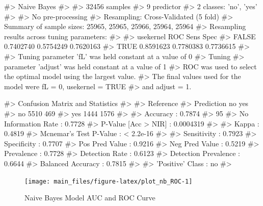 \begin{Schunk}
\begin{Soutput}
#> Naive Bayes 
#> 
#> 32456 samples
#>     9 predictor
#>     2 classes: 'no', 'yes' 
#> 
#> No pre-processing
#> Resampling: Cross-Validated (5 fold) 
#> Summary of sample sizes: 25965, 25965, 25966, 25964, 25964 
#> Resampling results across tuning parameters:
#> 
#>   usekernel  ROC        Sens       Spec     
#>   FALSE      0.7402740  0.5754249  0.7620163
#>    TRUE      0.8591623  0.7780383  0.7736615
#> 
#> Tuning parameter 'fL' was held constant at a value of 0
#> Tuning
#>  parameter 'adjust' was held constant at a value of 1
#> ROC was used to select the optimal model using the largest value.
#> The final values used for the model were fL = 0, usekernel = TRUE
#>  and adjust = 1.
\end{Soutput}
\end{Schunk}

\begin{Schunk}
\begin{Soutput}
#> Confusion Matrix and Statistics
#> 
#>           Reference
#> Prediction   no  yes
#>        no  5510  469
#>        yes 1444 1576
#>                                           
#>                Accuracy : 0.7874          
#>                  95%
#>     No Information Rate : 0.7728          
#>     P-Value [Acc > NIR] : 0.0004319       
#>                                           
#>                   Kappa : 0.4819          
#>  Mcnemar's Test P-Value : < 2.2e-16       
#>                                           
#>             Sensitivity : 0.7923          
#>             Specificity : 0.7707          
#>          Pos Pred Value : 0.9216          
#>          Neg Pred Value : 0.5219          
#>              Prevalence : 0.7728          
#>          Detection Rate : 0.6123          
#>    Detection Prevalence : 0.6644          
#>       Balanced Accuracy : 0.7815          
#>                                           
#>        'Positive' Class : no              
#> 
\end{Soutput}
\end{Schunk}

\begin{Schunk}
\begin{figure}[H]

{\centering \texttt{[image: main\_files/figure-latex/plot\_nb\_ROC-1]} 

}

\caption[Naive Bayes Model AUC and ROC Curve]{Naive Bayes Model AUC and ROC Curve}\label{fig:plot_nb_ROC}
\end{figure}
\end{Schunk}

